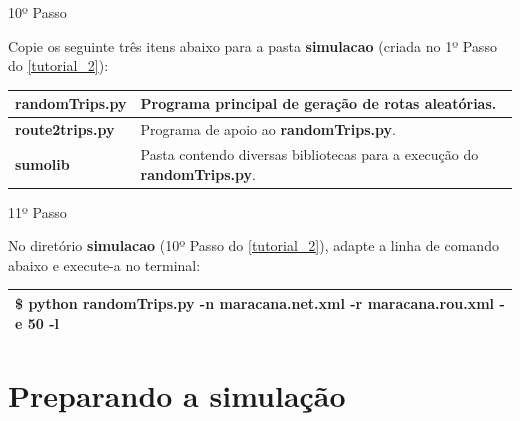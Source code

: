\documentclass[
12pt,				%
openright,			%
oneside,			%
a4paper,			%
brazil,				%
]{abntex2}
\begin{document}
{\begin{anexosenv}

            	\begin{description}
                    \item[10º Passo]
                \end{description}
                \par Copie os seguinte três itens abaixo para a pasta \textbf{simulacao} (criada no 1º Passo do \autoref{tutorial_2}): %
		
	            \begin{table}[H]
		            \renewcommand{\arraystretch}{1.5}
	                \begin{tabular}{|l|p{11.7cm}|}
		                \hline
                        \textbf{randomTrips.py} & Programa principal de geração de rotas aleatórias. \\ \hline
                        \textbf{route2trips.py} & Programa de apoio ao \textbf{randomTrips.py}. \\ \hline
                        \textbf{sumolib}        & Pasta contendo diversas bibliotecas para a execução do \textbf{randomTrips.py}. \\
		                \hline
		            \end{tabular}
	            \end{table}
                

            	\begin{description}
                    \item[11º Passo]
                \end{description}
                \par No diretório \textbf{simulacao} (10º Passo do \autoref{tutorial_2}), adapte a linha de comando abaixo e execute-a no terminal: %
		
	            \begin{table}[H]
		            \renewcommand{\arraystretch}{1.5}
	                \begin{tabular}{|p{15.5cm}|}
		                \hline
                        \$ python randomTrips.py -n \textbf{maracana}.net.xml -r \textbf{maracana}.rou.xml -e 50 -l \\
		                \hline
		            \end{tabular}
	            \end{table}
            
        	\section{Preparando a simulação}


\end{anexosenv}}
\end{document}

